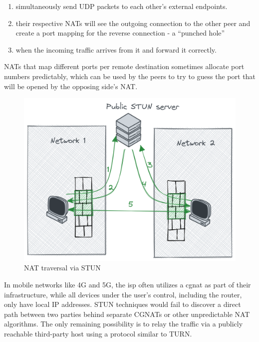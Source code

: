 \begin{enumerate}
\def\labelenumi{\arabic{enumi}.}
\tightlist
\item
  simultaneously send UDP packets to each other's external endpoints.
\item
  their respective NATs will see the outgoing connection to the other
  peer and create a port mapping for the reverse connection - a
  ``punched hole''
\item
  when the incoming traffic arrives from it and forward it correctly.
\end{enumerate}

NATs that map different ports per remote destination sometimes allocate
port numbers predictably, which can be used by the peers to try to guess
the port that will be opened by the opposing side's NAT.


\begin{figure}
\centering
\includegraphics[width=\textwidth,height=0.25\textheight]{thesis/../figures/nat-traversal.png}
\caption{NAT traversal via STUN\label{nat-traversal}}
\end{figure}

In mobile networks like 4G and 5G, the \gls{isp} often utilizes a
\gls{cgnat} as part of their infrastructure, while all devices under the
user's control, including the router, only have local IP addresses. STUN
techniques would fail to discover a direct path between two parties
behind separate CGNATs or other unpredictable NAT algorithms. The only
remaining possibility is to relay the traffic via a publicly reachable
third-party host using a protocol similar to TURN.


